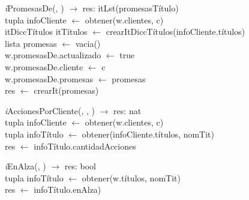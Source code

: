 \begin{Representacion}
\begin{Algoritmos}
\begin{algorithm}[H]
\textit{i}PromesasDe(, ) $\longrightarrow$ res: itLst(promesasTítulo)\\
\BlankLine
{}
\BlankLine
tupla infoCliente $\leftarrow$ obtener(w.clientes, c)\\
itDiccTítulos itTítulos $\leftarrow$ crearItDiccTítulos(infoCliente.títulos)\\
lista promesas $\leftarrow$ vacia()\\
\BlankLine
w.promesasDe.actualizado $\leftarrow$ true\\
w.promesasDe.cliente $\leftarrow$ c\\
w.promesasDe.promesas $\leftarrow$ promesas\\
\BlankLine
res $\leftarrow$ crearIt(promesas)\\
\end{algorithm}

\begin{algorithm}[H]
\textit{i}AccionesPorCliente(, , ) $\longrightarrow$ res: nat\\
\BlankLine
tupla infoCliente $\leftarrow$ obtener(w.clientes, c)\\
tupla infoTítulo $\leftarrow$ obtener(infoCliente.títulos, nomTit)\\
res $\leftarrow$ infoTítulo.cantidadAcciones\\
\end{algorithm}

\begin{algorithm}[H]
\textit{i}EnAlza(, ) $\longrightarrow$ res: bool\\
\BlankLine
tupla infoTítulo $\leftarrow$ obtener(w.títulos, nomTit)\\
res $\leftarrow$ infoTítulo.enAlza)\\
\end{algorithm}



\end{Algoritmos}
\end{Representacion}
